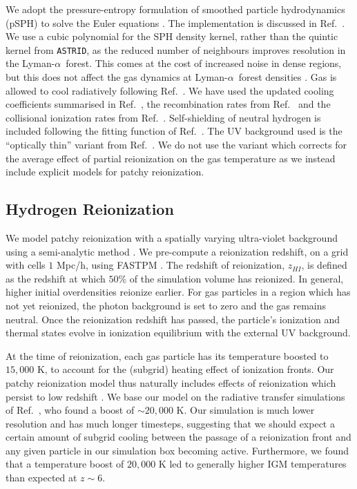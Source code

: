 \documentclass[a4paper,11pt]{article}
\newcommand{\Lya}{Lyman-$\alpha$}
\newcommand{\astrid}{\texttt{ASTRID}}
\begin{document}
We adopt the pressure-entropy formulation of smoothed particle hydrodynamics (pSPH) to solve the Euler equations \citep{Hopkins:2013,Read:2010}. The implementation is discussed in Ref.~\cite{Feng:2014}. %
We use a cubic polynomial for the SPH density kernel, rather than the quintic kernel from \astrid, as the reduced number of neighbours improves resolution in the \Lya~forest. This comes at the cost of increased noise in dense regions, but this does not affect the gas dynamics at \Lya~forest densities \cite{Bird:2013}.
Gas is allowed to cool radiatively following Ref.~\citep{Katz:1996}.
We have used the updated cooling coefficients summarised in Ref.~\cite{Bolton:2017}, the recombination rates from Ref.~\cite{Verner:1996} and the collisional ionization rates from Ref.~\cite{Voronov:1997}. Self-shielding of neutral hydrogen is included following the fitting function of Ref.~\cite{Rahmati:2013}.
The UV background used is the ``optically thin'' variant from Ref.~\cite{FG2020}. We do not use the variant which corrects for the average effect of partial reionization on the gas temperature as we instead include explicit models for patchy reionization.

\subsection{Hydrogen Reionization}
\label{sec:hydrogen}

We model patchy reionization with a spatially varying ultra-violet background using a semi-analytic method \cite{Battaglia:2013}. We pre-compute a reionization redshift, on a grid with cells $1$ Mpc/h, using FASTPM \cite{FASTPM}. The redshift of reionization, $z_{HI}$, is defined as the redshift at which $50\%$ of the simulation volume has reionized. In general, higher initial overdensities reionize earlier. For gas particles in a region which has not yet reionized, the photon background is set to zero and the gas remains neutral. Once the reionization redshift has passed, the particle's ionization and thermal states evolve in ionization equilibrium with the external UV background.

At the time of reionization, each gas particle has its temperature boosted to $15,000$ K, to account for the (subgrid) heating effect of ionization fronts. Our patchy reionization model thus naturally includes effects of reionization which persist to low redshift \citep{Montero:2019}.
We base our model on the radiative transfer simulations of Ref.~\citep{DAloisio:2019}, who found a boost of $\sim 20,000$ K. Our simulation is much lower resolution and has much longer timesteps, suggesting that we should expect a certain amount of subgrid cooling between the passage of a reionization front and any given particle in our simulation box becoming active. Furthermore, we found that a temperature boost of $20,000$ K led to generally higher IGM temperatures than expected at $z\sim 6$.
\end{document}

